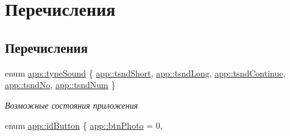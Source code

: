 \hypertarget{group___xD0_x9F_xD0_xB5_xD1_x80_xD0_xB5_xD1_x87_xD0_xB8_xD1_x81_xD0_xBB_xD0_xB5_xD0_xBD_xD0_xB8_xD1_x8F}{}\section{Перечисления}
\label{group___xD0_x9F_xD0_xB5_xD1_x80_xD0_xB5_xD1_x87_xD0_xB8_xD1_x81_xD0_xBB_xD0_xB5_xD0_xBD_xD0_xB8_xD1_x8F}
\subsection*{Перечисления}
\begin{DoxyCompactItemize}
\item 
enum \hyperlink{group___xD0_x9F_xD0_xB5_xD1_x80_xD0_xB5_xD1_x87_xD0_xB8_xD1_x81_xD0_xBB_xD0_xB5_xD0_xBD_xD0_xB8_xD1_x8F_ga33d8f1a04a907b6c65c5dfc88280ac6f}{app\+::type\+Sound} \{ \newline
\hyperlink{group___xD0_x9F_xD0_xB5_xD1_x80_xD0_xB5_xD1_x87_xD0_xB8_xD1_x81_xD0_xBB_xD0_xB5_xD0_xBD_xD0_xB8_xD1_x8F_gga33d8f1a04a907b6c65c5dfc88280ac6fa7237f8fa77d12dd4dd2bd7ca320f2ba3}{app\+::tsnd\+Short}, 
\hyperlink{group___xD0_x9F_xD0_xB5_xD1_x80_xD0_xB5_xD1_x87_xD0_xB8_xD1_x81_xD0_xBB_xD0_xB5_xD0_xBD_xD0_xB8_xD1_x8F_gga33d8f1a04a907b6c65c5dfc88280ac6fab038273ec32ea611833df74a8855a7af}{app\+::tsnd\+Long}, 
\hyperlink{group___xD0_x9F_xD0_xB5_xD1_x80_xD0_xB5_xD1_x87_xD0_xB8_xD1_x81_xD0_xBB_xD0_xB5_xD0_xBD_xD0_xB8_xD1_x8F_gga33d8f1a04a907b6c65c5dfc88280ac6fa5257e7bbc9210bbb1b35bbfea7b01e4c}{app\+::tsnd\+Continue}, 
\hyperlink{group___xD0_x9F_xD0_xB5_xD1_x80_xD0_xB5_xD1_x87_xD0_xB8_xD1_x81_xD0_xBB_xD0_xB5_xD0_xBD_xD0_xB8_xD1_x8F_gga33d8f1a04a907b6c65c5dfc88280ac6fa35fbafcd3b5c779f5582c19e3062ee4c}{app\+::tsnd\+No}, 
\newline
\hyperlink{group___xD0_x9F_xD0_xB5_xD1_x80_xD0_xB5_xD1_x87_xD0_xB8_xD1_x81_xD0_xBB_xD0_xB5_xD0_xBD_xD0_xB8_xD1_x8F_gga33d8f1a04a907b6c65c5dfc88280ac6fabc61bb41fc29eb6b61dddfb0ff48faad}{app\+::tsnd\+Num}
 \}\begin{DoxyCompactList}\small\item\em Возможные состояния приложения \end{DoxyCompactList}
\item 
enum \hyperlink{group___xD0_x9F_xD0_xB5_xD1_x80_xD0_xB5_xD1_x87_xD0_xB8_xD1_x81_xD0_xBB_xD0_xB5_xD0_xBD_xD0_xB8_xD1_x8F_ga6d8c7037d5bd282629dd75cb7fea9a7c}{app\+::id\+Button} \{ \newline
\hyperlink{group___xD0_x9F_xD0_xB5_xD1_x80_xD0_xB5_xD1_x87_xD0_xB8_xD1_x81_xD0_xBB_xD0_xB5_xD0_xBD_xD0_xB8_xD1_x8F_gga6d8c7037d5bd282629dd75cb7fea9a7cac8a3a3ea38cf926da57b369426afb75d}{app\+::btn\+Photo} = 0, 

\end{DoxyCompactItemize}
